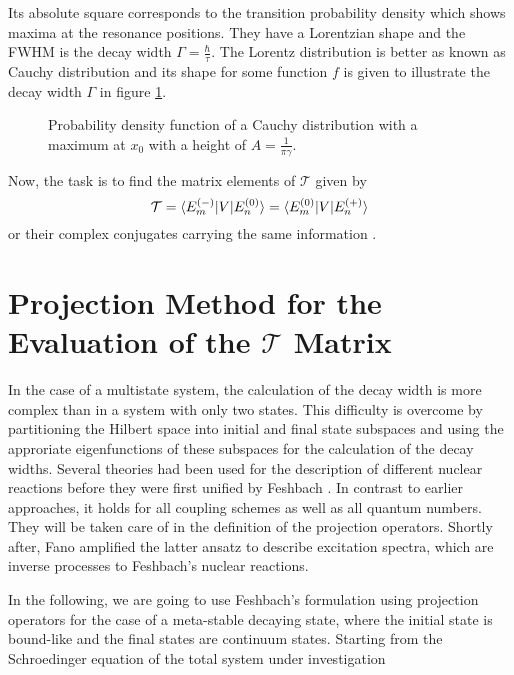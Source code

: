 Its absolute square corresponds to the transition probability density
which shows maxima at the resonance positions. They have a Lorentzian shape
and the \ac{FWHM} is the decay width $\Gamma=\frac{\hbar}{\tau}$. The Lorentz
distribution is better as known as Cauchy distribution and its shape for some
function $f$ is given to illustrate the decay width $\Gamma$ in figure
\ref{figure:general_resonance}.


\begin{figure}[h]
  \centering
  
  \caption{Probability density function of a Cauchy distribution with a
           maximum at $x_0$ with a height of $A=\frac{1}{\pi\gamma}$.}
  \label{figure:general_resonance}
\end{figure}

Now, the task is to find the matrix elements of $\mathcal{T}$ given by
\begin{equation}
 \mathcal{T} = \braket{E_m^{(-)}| V | E_n^{(0)}} = \braket{E_m^{(0)}| V |E_n^{(+)}}
\end{equation}
or their complex conjugates carrying the same information \cite{Feshbach_book}.



\section{Projection Method for the Evaluation of the $\mathcal{T}$ Matrix}

In the case of a multistate system, the calculation of the decay width is more
complex than in a system with only two states.
This difficulty is overcome by partitioning the Hilbert space into initial and final
state subspaces and using the approriate eigenfunctions of these subspaces for the
calculation of the decay widths. 
Several theories had been used for the description of different nuclear reactions
before they were first unified by Feshbach \cite{Feshbach58,Feshbach62,Feshbach_book}.
In contrast to earlier approaches, it holds for all coupling schemes as well as
all quantum numbers. They will be taken care of in the definition of the
projection operators.
Shortly after,
Fano amplified the latter ansatz to describe excitation spectra, which
are inverse processes to Feshbach's nuclear reactions.\cite{Fano61}


In the following, we are going to use Feshbach's formulation using projection
operators for the case of a meta-stable decaying state, where the initial state
is bound-like and the final states are continuum states.
Starting from the Schroedinger equation of the total system under investigation

